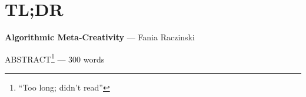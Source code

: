
\pagestyle{empty}

\chapter{TL;DR}
\label{abstract}

{\Large \textbf{Algorithmic Meta-Creativity}} --- Fania Raczinski

\vspace{0.5cm}
ABSTRACT\footnote{``Too long; didn't read''} --- 300 words

\lipsum[1-2]

\clearpage
